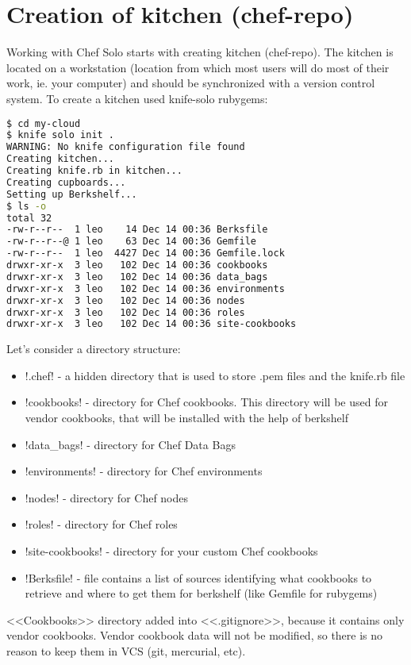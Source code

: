 \section{Creation of kitchen (chef-repo)}
\label{sec:solo-kitchen}

Working with Chef Solo starts with creating kitchen (chef-repo). The kitchen is located on a workstation (location from which most users will do most of their work, ie. your computer) and should be synchronized with a version control system. To create a kitchen used knife-solo rubygems:

\begin{lstlisting}[language=Bash,label=lst:my-cloud-kitchen1,title=my-cloud]
$ cd my-cloud
$ knife solo init .
WARNING: No knife configuration file found
Creating kitchen...
Creating knife.rb in kitchen...
Creating cupboards...
Setting up Berkshelf...
$ ls -o
total 32
-rw-r--r--  1 leo    14 Dec 14 00:36 Berksfile
-rw-r--r--@ 1 leo    63 Dec 14 00:36 Gemfile
-rw-r--r--  1 leo  4427 Dec 14 00:36 Gemfile.lock
drwxr-xr-x  3 leo   102 Dec 14 00:36 cookbooks
drwxr-xr-x  3 leo   102 Dec 14 00:36 data_bags
drwxr-xr-x  3 leo   102 Dec 14 00:36 environments
drwxr-xr-x  3 leo   102 Dec 14 00:36 nodes
drwxr-xr-x  3 leo   102 Dec 14 00:36 roles
drwxr-xr-x  3 leo   102 Dec 14 00:36 site-cookbooks
\end{lstlisting}

Let's consider a directory structure:

\begin{itemize}
  \item \inline!.chef! - a hidden directory that is used to store .pem files and the knife.rb file
  \item \inline!cookbooks! - directory for Chef cookbooks. This directory will be used for vendor cookbooks, that will be installed with the help of berkshelf
  \item \inline!data_bags! - directory for Chef Data Bags
  \item \inline!environments! - directory for Chef environments
  \item \inline!nodes! - directory for Chef nodes
  \item \inline!roles! - directory for Chef roles
  \item \inline!site-cookbooks! - directory for your custom Chef cookbooks
  \item \inline!Berksfile! - file contains a list of sources identifying what cookbooks to retrieve and where to get them for berkshelf (like Gemfile for rubygems)
\end{itemize}

<<Cookbooks>> directory added into <<.gitignore>>, because it contains only vendor cookbooks. Vendor cookbook data will not be modified, so there is no reason to keep them in VCS (git, mercurial, etc).
